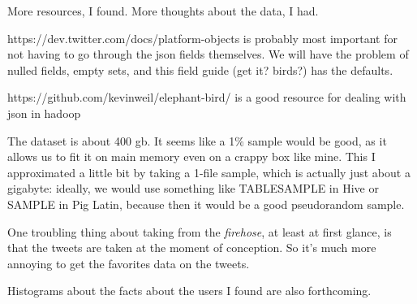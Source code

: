 More resources, I found. More thoughts about the data, I had.

https://dev.twitter.com/docs/platform-objects is probably most important for not having to go through the json fields themselves. We will have the problem of nulled fields, empty sets, and this field guide (get it? birds?) has the defaults.

https://github.com/kevinweil/elephant-bird/ is a good resource for dealing with json in hadoop

The dataset is about 400 gb. It seems like a 1\% sample would be good, as it allows us to fit it on main memory even on a crappy box like mine. This I approximated a little bit by taking a 1-file sample, which is actually just about a gigabyte: ideally, we would use something like TABLESAMPLE in Hive or SAMPLE in Pig Latin, because then it would be a good pseudorandom sample.

One troubling thing about taking from the \emph{firehose}, at least at first glance, is that the tweets are taken at the moment of conception. So it's much more annoying to get the favorites data on the tweets.

Histograms about the facts about the users I found are also forthcoming.
